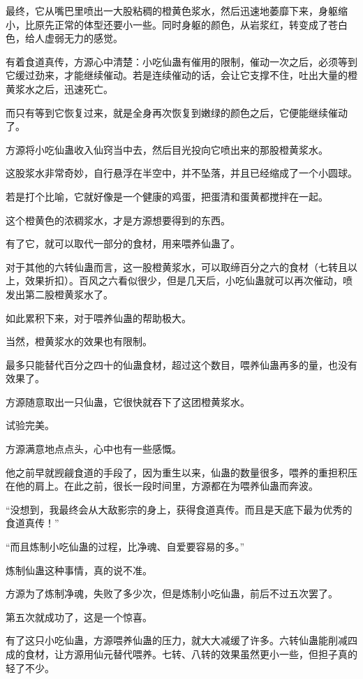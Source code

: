 \begin{this_body}
最终，它从嘴巴里喷出一大股粘稠的橙黄色浆水，然后迅速地萎靡下来，身躯缩小，比原先正常的体型还要小一些。同时身躯的颜色，从岩浆红，转变成了苍白色，给人虚弱无力的感觉。

有着食道真传，方源心中清楚：小吃仙蛊有催用的限制，催动一次之后，必须等到它缓过劲来，才能继续催动。若是连续催动的话，会让它支撑不住，吐出大量的橙黄浆水之后，迅速死亡。

而只有等到它恢复过来，就是全身再次恢复到嫩绿的颜色之后，它便能继续催动了。

方源将小吃仙蛊收入仙窍当中去，然后目光投向它喷出来的那股橙黄浆水。

这股浆水非常奇妙，自行悬浮在半空中，并不坠落，并且已经缩成了一个小圆球。

若是打个比喻，它就好像是一个健康的鸡蛋，把蛋清和蛋黄都搅拌在一起。

这个橙黄色的浓稠浆水，才是方源想要得到的东西。

有了它，就可以取代一部分的食材，用来喂养仙蛊了。

对于其他的六转仙蛊而言，这一股橙黄浆水，可以取缔百分之六的食材（七转且以上，效果折扣）。百风之六看似很少，但是几天后，小吃仙蛊就可以再次催动，喷发出第二股橙黄浆水了。

如此累积下来，对于喂养仙蛊的帮助极大。

当然，橙黄浆水的效果也有限制。

最多只能替代百分之四十的仙蛊食材，超过这个数目，喂养仙蛊再多的量，也没有效果了。

方源随意取出一只仙蛊，它很快就吞下了这团橙黄浆水。

试验完美。

方源满意地点点头，心中也有一些感慨。

他之前早就觊觎食道的手段了，因为重生以来，仙蛊的数量很多，喂养的重担积压在他的肩上。在此之前，很长一段时间里，方源都在为喂养仙蛊而奔波。

“没想到，我最终会从大敌影宗的身上，获得食道真传。而且是天底下最为优秀的食道真传！”

“而且炼制小吃仙蛊的过程，比净魂、自爱要容易的多。”

炼制仙蛊这种事情，真的说不准。

方源为了炼制净魂，失败了多少次，但是炼制小吃仙蛊，前后不过五次罢了。

第五次就成功了，这是一个惊喜。

有了这只小吃仙蛊，方源喂养仙蛊的压力，就大大减缓了许多。六转仙蛊能削减四成的食材，让方源用仙元替代喂养。七转、八转的效果虽然更小一些，但担子真的轻了不少。


\end{this_body}
